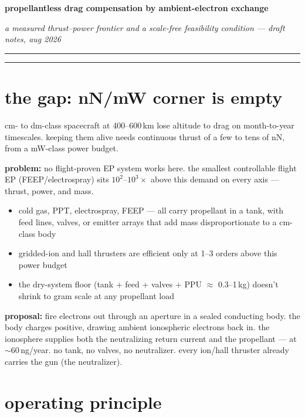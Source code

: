 \documentclass[11pt]{article}
\begin{document}
{\Large\bfseries propellantless drag compensation by ambient-electron exchange}

\medskip
{\itshape a measured thrust--power frontier and a scale-free feasibility condition --- draft notes, aug 2026}

\medskip\hrule\bigskip

\tableofcontents
\bigskip\hrule

\section{the gap: nN/mW corner is empty}

cm- to dm-class spacecraft at 400--600\,km lose altitude to drag on
month-to-year timescales.  keeping them alive needs continuous thrust of a few
to tens of nN, from a mW-class power budget.

\textbf{problem:} no flight-proven EP system works here.  the smallest
controllable flight EP (FEEP/electrospray) sits $10^2$--$10^3\times$ above this
demand on every axis --- thrust, power, and mass.

\begin{itemize}
  \item cold gas, PPT, electrospray, FEEP --- all carry propellant in a tank,
        with feed lines, valves, or emitter arrays that add mass
        disproportionate to a cm-class body
  \item gridded-ion and hall thrusters are efficient only at 1--3 orders above
        this power budget
  \item the dry-system floor (tank + feed + valves + PPU $\approx$ 0.3--1\,kg)
        doesn't shrink to gram scale at any propellant load
\end{itemize}

\textbf{proposal:} fire electrons out through an aperture in a sealed
conducting body.  the body charges positive, drawing ambient ionospheric
electrons back in.  the ionosphere supplies both the neutralizing return
current and the propellant --- at $\sim$60\,ng/year.  no tank, no valves, no
neutralizer.  every ion/hall thruster already carries the gun (the
neutralizer).

\section{operating principle}
\end{document}
